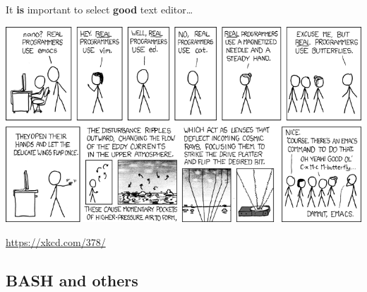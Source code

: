 \documentclass[compress, ucs, xelatex, 11pt, xcolor=svgnames,
  hyperref={
    bookmarks=true,
    unicode=true,
    colorlinks=true,
    pdftitle={Linux, command line and MetaCentrum},
    plainpages=false,
    pdfauthor={Vojtech Zeisek},
    pdfsubject={Course about use of Linux command line, writing shell scripts and using MetaCentrum of CESNET},
    pdfcreator={XeLaTeX},
    pdfkeywords={Linux, GNU, BASH, shell, command line, MetaCentrum},
    linkcolor=DarkRed,
    anchorcolor=DarkBlue,
    citecolor=Indigo,
    filecolor=NavyBlue,
    menucolor=DarkMagenta,
    urlcolor=DarkBlue,
    pdftex},
  url={hyphens, lowtilde} %
  ]{beamer}
\begin{document}
\begin{frame}{It \textbf{is} important to select \textbf{good} text editor\ldots}
  \begin{center}
    \includegraphics[width=\textwidth-1cm]{real_programmers.png}
  \end{center}
  \begin{flushright}
    \url{https://xkcd.com/378/}
  \end{flushright}
\end{frame}

\subsection{BASH and others}
\end{document}
